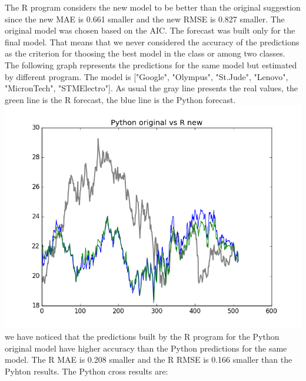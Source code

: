 \documentclass[
  twoside,
  12pt, a4paper,
  footinclude=true,
  headinclude=true,
  cleardoublepage=empty
]{article}
\begin{document}
The R program considers the new model to be better than the original suggestion since the new MAE is 0.661 smaller and the new RMSE is 0.827 smaller. The original model was chosen based on the AIC. The forecast was built only for the final model. That means that we never considered the accuracy of the predictions as the criterion for thoosing the best model in the class or among two classes.\\
The following graph represents the predictions for the same model but estimated by different program. The model is ["Google", "Olympus", "St.Jude", "Lenovo", "MicronTech", "STMElectro"]. As usual the gray line presents the real values, the green line is the R forecast, the blue line is the Python forecast.\\
\includegraphics[scale=0.75]{PythonOriginalVsRNew.png}
we have noticed that the predictions built by the R program for the Python original model have higher accuracy than the Python predictions for the same model. The R MAE is 0.208 smaller and the R RMSE is 0.166 smaller than the Pyhton results.
The Python cross results are:
\end{document}
